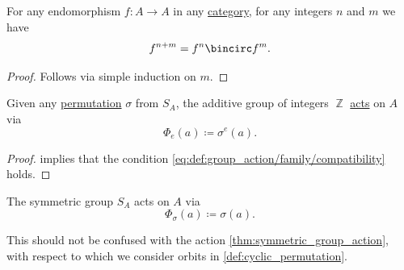 \begin{lemma}\label{thm:sum_of_powers_in_composition}
  For any endomorphism \( f: A \to A \) in any \hyperref[def:category]{category}, for any integers \( n \) and \( m \) we have
  \begin{equation*}
    f^{n + m} = f^n \bincirc f^m.
  \end{equation*}
\end{lemma}
\begin{proof}
  Follows via simple induction on \( m \).
\end{proof}

\begin{proposition}\label{thm:symmetric_group_action}
  Given any \hyperref[def:symmetric_group]{permutation} \( \sigma \) from \( S_A \), the additive group of integers \( \BbbZ \) \hyperref[def:group_action]{acts} on \( A \) via
  \begin{equation*}
    \Phi_e(a) \coloneqq \sigma^e(a).
  \end{equation*}
\end{proposition}
\begin{proof}
   implies that the condition \eqref{eq:def:group_action/family/compatibility} holds.
\end{proof}

\begin{remark}\label{rem:symmetric_group_actions}
  The symmetric group \( S_A \) acts on \( A \) via
  \begin{equation*}
    \Phi_\sigma(a) \coloneqq \sigma(a).
  \end{equation*}

  This should not be confused with the action \cref{thm:symmetric_group_action}, with respect to which we consider orbits in \cref{def:cyclic_permutation}.
\end{remark}

